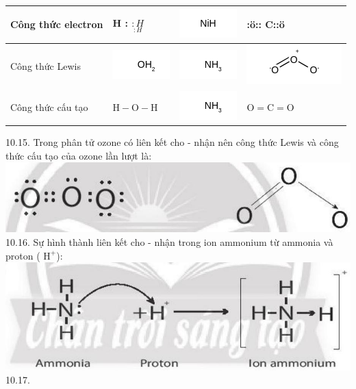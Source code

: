 \documentclass[10pt]{article}
\begin{document}
\begin{center}
\begin{tabular}{|l|l|l|l|}
\hline
Công thức electron & H : $\underset{: H}{: H}$ & \includegraphics{smile-6d1c1c6c59a45ae1630c20f8dcf641d7b660278c} & :ö:: C::ö \\
\hline
Công thức Lewis & \includegraphics{smile-d9bb0c9bb3eef87aee33bd96641c3201ad545603} & \includegraphics{smile-d0f8f18108d8de41d9548b849ef64c0f13afc857} & \includegraphics{smile-ce2ef27ef5d4e8de631ee9eddc4f89c57c2f7b07} \\
\hline
Công thức cấu tạo & $\mathrm{H}-\mathrm{O}-\mathrm{H}$ & \includegraphics{smile-549ce04ec05374711c5e3bd7129df72db9315ede} & $\mathrm{O}=\mathrm{C}=\mathrm{O}$ \\
\hline
\end{tabular}
\end{center}

10.15. Trong phân tử ozone có liên kết cho - nhận nên công thức Lewis và công thức cấu tạo của ozone lần lượt là:\\
\includegraphics[max width=\textwidth, center]{2025_10_23_57761e23b8c46a11c3efg-25(1)}\\
10.16. Sự hình thành liên kết cho - nhận trong ion ammonium từ ammonia và proton ( $\mathrm{H}^{+}$):\\
\includegraphics[max width=\textwidth, center]{2025_10_23_57761e23b8c46a11c3efg-25}\\
10.17.
\end{document}

